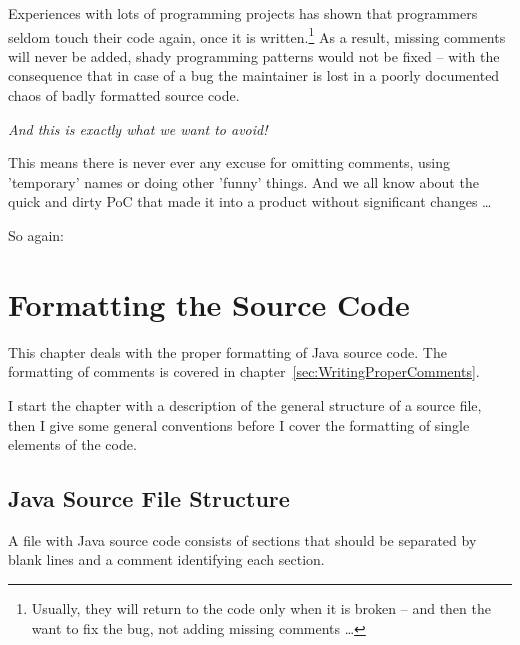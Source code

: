 \documentclass[12pt,a4paper,titlepage, parskip=half, headsepline, footsepline, cleardoubleplain]{scrbook}
\begin{document}
\begin{center}
\begin{huge}
\end{huge}
\end{center}

Experiences with lots of programming projects has shown that programmers seldom touch their code again, once it is written.\footnote{Usually, they will return to the code only when it is broken – and then the want to fix the bug, not adding missing comments …} As a result, missing comments will never be added, shady programming patterns would not be fixed – with the consequence that in case of a bug the maintainer is lost in a poorly documented chaos of badly formatted source code.

\textit{And this is exactly what we want to avoid!} 

This means there is never ever any excuse for omitting comments, using 'temporary' names or doing other 'funny' things. And we all know about the quick and dirty PoC that made it into a product without significant changes …

So again:

\begin{center}
\begin{huge}
\end{huge}
\end{center}

\chapter{Formatting the Source Code}\label{sec:FormattingTheSourceCode}
This chapter deals with the proper formatting of Java source code. The formatting of comments is covered in chapter~\vref{sec:WritingProperComments}.

I start the chapter with a description of the general structure of a source file, then I give some general conventions before I cover the formatting of single elements of the code.

\section{Java Source File Structure}
A file with Java source code consists of sections that should be separated by blank lines and a comment identifying each section.
\end{document}
